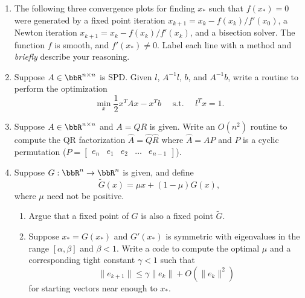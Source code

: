 \documentclass[12pt, leqno]{article}
\begin{document}
\begin{enumerate}
\item
  The following three convergence plots for finding $x_*$ such that
  $f(x_*) = 0$ were generated by a fixed point iteration
  $x_{k+1} = x_k - f(x_k)/f'(x_0)$, a Newton iteration
  $x_{k+1} = x_k - f(x_k)/f'(x_k)$, and a bisection solver.
  The function $f$ is smooth, and $f'(x_*) \neq 0$.
  Label each line with a method and {\em briefly} describe your
  reasoning.
  \begin{center}
  \end{center}

\item
  Suppose $A \in \bbR^{n \times n}$ is SPD.  Given $l$, $A^{-1} l$, $b$,
  and $A^{-1} b$, write a routine to perform the optimization
  \[
    \min_{x} \frac{1}{2} x^T A x - x^T b \quad \mbox{ s.t. } \quad l^Tx = 1.
  \]

\item
  Suppose $A \in \bbR^{n \times n}$ and $A = QR$ is given.  Write an
  $O(n^2)$ routine to compute the QR factorization $\hat{A} = \hat{Q}
  \hat{R}$ where $\hat{A} = AP$ and $P$ is a cyclic permutation
  ($P = \begin{bmatrix} e_n & e_1 & e_2 & \ldots & e_{n-1} \end{bmatrix}$).

\item
  Suppose $G : \bbR^n \rightarrow \bbR^n$ is given, and define
  \[
    \tilde{G}(x) = \mu x + (1-\mu) G(x),
  \]
  where $\mu$ need not be positive.
  \begin{enumerate}
  \item Argue that a fixed point of $G$ is also a fixed point
    $\tilde{G}$.
  \item Suppose $x_* = G(x_*)$ and $G'(x_*)$ is symmetric with eigenvalues
    in the range $[\alpha, \beta]$ and $\beta < 1$.  Write a code to
    compute the optimal $\mu$ and a corresponding tight constant
    $\gamma < 1$ such that
    \[
      \|e_{k+1}\| \leq \gamma \|e_k\| + O(\|e_k\|^2)
    \]
    for starting vectors near enough to $x_*$.
  \end{enumerate}


\end{enumerate}
\end{document}

